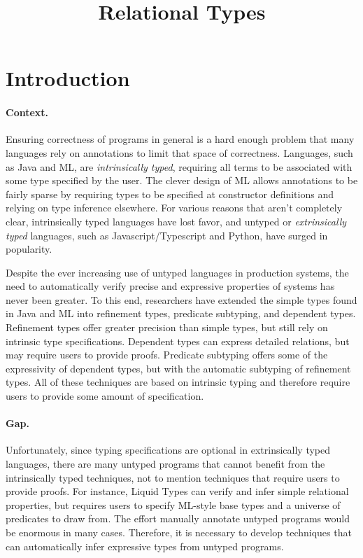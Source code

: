 \documentclass[letterpaper]{llncs}
\title{Relational Types}
\begin{document}
\maketitle


\section{Introduction}

\paragraph{Context.} 
Ensuring correctness of programs in general is a hard enough problem
that many languages rely on annotations to limit that space of correctness.
Languages, such as Java and ML, are \textit{intrinsically typed}, requiring
all terms to be associated with some type specified by the user. 
The clever design of ML allows annotations to be fairly sparse by 
requiring types to be specified at constructor definitions and relying on type inference elsewhere.
For various reasons that aren't completely clear, intrinsically typed languages have lost favor,
and untyped or \textit{extrinsically typed} languages, 
such as Javascript/Typescript and Python, have surged in popularity. 

Despite the ever increasing use of untyped languages in production systems, 
the need to automatically verify precise and expressive properties of systems has never been greater.
To this end, researchers have extended the simple types found in Java and ML into 
refinement types, predicate subtyping, and dependent types. 
Refinement types offer greater precision than simple types, but still rely on intrinsic type specifications.
Dependent types can express detailed relations, but may require users to provide proofs.
Predicate subtyping offers some of the expressivity of dependent types, 
but with the automatic subtyping of refinement types.
All of these techniques are based on intrinsic typing and therefore require users to provide some amount of specification.

\paragraph{Gap.} 
Unfortunately, since typing specifications are optional in extrinsically typed languages,
there are many untyped programs that cannot benefit from the intrinsically typed techniques,
not to mention techniques that require users to provide proofs.
For instance, Liquid Types can verify and infer simple relational properties, but requires
users to specify ML-style base types and a universe of predicates to draw from.
The effort manually annotate untyped programs would be enormous in many cases.
Therefore, it is necessary to develop techniques that can automatically infer expressive types
from untyped programs.
\end{document}
